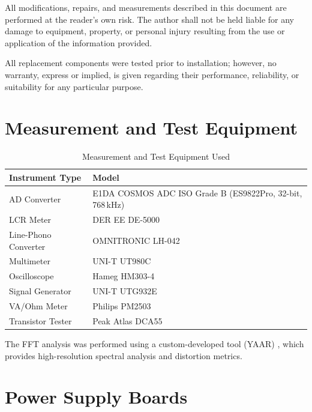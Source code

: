 \documentclass[]{article}
\begin{document}
All modifications, repairs, and measurements described in this document are performed at the reader's own risk. The author shall not be held liable for any damage to equipment, property, or personal injury resulting from the use or application of the information provided.

All replacement components were tested prior to installation; however, no warranty, express or implied, is given regarding their performance, reliability, or suitability for any particular purpose.

\section{Measurement and Test Equipment}

\begin{table}[H]
	\centering
	\caption{Measurement and Test Equipment Used}
	\label{tab:tools}
	\begin{tabular}{ll}
		\hline
		\textbf{Instrument Type} & \textbf{Model} \\
		\hline
		AD Converter & E1DA COSMOS ADC ISO Grade B (ES9822Pro, 32-bit, 768\,kHz) \\
		LCR Meter & DER EE DE-5000 \\
		Line-Phono Converter & OMNITRONIC LH-042 \\
		Multimeter & UNI-T UT980C \\
		Oscilloscope & Hameg HM303-4 \\
		Signal Generator & UNI-T UTG932E \\
		VA/Ohm Meter & Philips PM2503 \\
        Transistor Tester & Peak Atlas DCA55 \\
		\hline
	\end{tabular}
\end{table}

The FFT analysis was performed using a custom-developed tool (YAAR) \cite{yaar}, which provides high-resolution spectral analysis and distortion metrics.

\section{Power Supply Boards}
\end{document}
